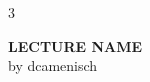 \documentclass[10pt, landscape, a4paper]{article}
\begin{document}
\begin{multicols*}{3}


\begin{center}
	\Large{\textbf{LECTURE NAME}} \\
    \small{by dcamenisch}
\end{center}



\end{multicols*}
\end{document}
